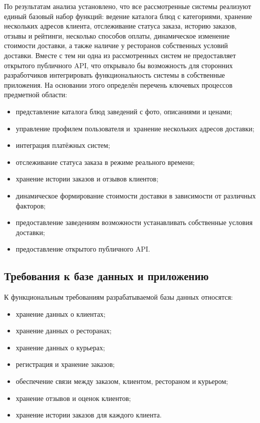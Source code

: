 По результатам анализа установлено, что все рассмотренные системы реализуют единый базовый набор функций: ведение каталога блюд с категориями, хранение нескольких адресов клиента, отслеживание статуса заказа, историю заказов, отзывы и рейтинги, несколько способов оплаты, динамическое изменение стоимости доставки, а также наличие у ресторанов собственных условий доставки. Вместе с тем ни одна из рассмотренных систем не предоставляет открытого публичного API, что открывало бы возможность для сторонних разработчиков интегрировать функциональность системы в собственные приложения. На основании этого определён перечень ключевых процессов предметной области:
\begin{itemize}
    \item представление каталога блюд заведений с фото, описаниями и ценами;
    \item управление профилем пользователя и~хранение нескольких адресов доставки;
    \item интеграция платёжных систем;
    \item отслеживание статуса заказа в режиме реального времени;
    \item хранение истории заказов и отзывов клиентов;
    \item динамическое формирование стоимости доставки в зависимости от различных факторов;
    \item предоставление заведениям возможности устанавливать собственные условия доставки;
    \item предоставление открытого публичного API.
\end{itemize}

\subsection{Требования к базе данных и приложению}
К функциональным требованиям разрабатываемой базы данных относятся:
\begin{itemize}
    \item хранение данных о клиентах;
    \item хранение данных о ресторанах;
    \item хранение данных о курьерах;
    \item регистрация и хранение заказов;
    \item обеспечение связи между заказом, клиентом, рестораном и курьером;
    \item хранение отзывов и оценок клиентов;
    \item хранение истории заказов для каждого клиента.
\end{itemize}


